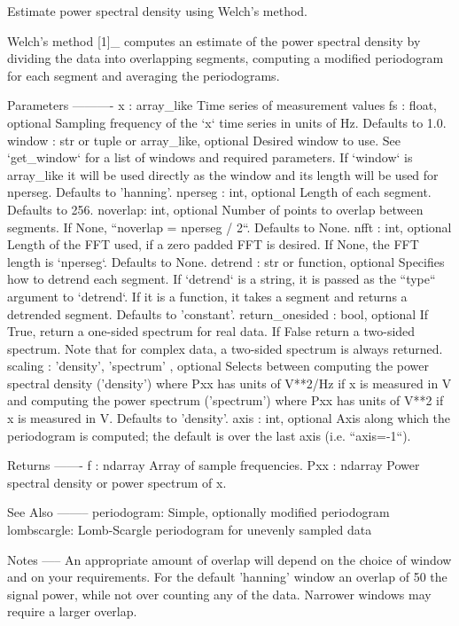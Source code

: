 \begin{DoxyVerb}Estimate power spectral density using Welch's method.

Welch's method [1]_ computes an estimate of the power spectral density
by dividing the data into overlapping segments, computing a modified
periodogram for each segment and averaging the periodograms.

Parameters
----------
x : array_like
    Time series of measurement values
fs : float, optional
    Sampling frequency of the `x` time series in units of Hz. Defaults
    to 1.0.
window : str or tuple or array_like, optional
    Desired window to use. See `get_window` for a list of windows and
    required parameters. If `window` is array_like it will be used
    directly as the window and its length will be used for nperseg.
    Defaults to 'hanning'.
nperseg : int, optional
    Length of each segment.  Defaults to 256.
noverlap: int, optional
    Number of points to overlap between segments. If None,
    ``noverlap = nperseg / 2``.  Defaults to None.
nfft : int, optional
    Length of the FFT used, if a zero padded FFT is desired.  If None,
    the FFT length is `nperseg`. Defaults to None.
detrend : str or function, optional
    Specifies how to detrend each segment. If `detrend` is a string,
    it is passed as the ``type`` argument to `detrend`. If it is a
    function, it takes a segment and returns a detrended segment.
    Defaults to 'constant'.
return_onesided : bool, optional
    If True, return a one-sided spectrum for real data. If False return
    a two-sided spectrum. Note that for complex data, a two-sided
    spectrum is always returned.
scaling : { 'density', 'spectrum' }, optional
    Selects between computing the power spectral density ('density')
    where Pxx has units of V**2/Hz if x is measured in V and computing
    the power spectrum ('spectrum') where Pxx has units of V**2 if x is
    measured in V. Defaults to 'density'.
axis : int, optional
    Axis along which the periodogram is computed; the default is over
    the last axis (i.e. ``axis=-1``).

Returns
-------
f : ndarray
    Array of sample frequencies.
Pxx : ndarray
    Power spectral density or power spectrum of x.

See Also
--------
periodogram: Simple, optionally modified periodogram
lombscargle: Lomb-Scargle periodogram for unevenly sampled data

Notes
-----
An appropriate amount of overlap will depend on the choice of window
and on your requirements.  For the default 'hanning' window an
overlap of 50%
the signal power, while not over counting any of the data.  Narrower
windows may require a larger overlap.


\end{DoxyVerb}
